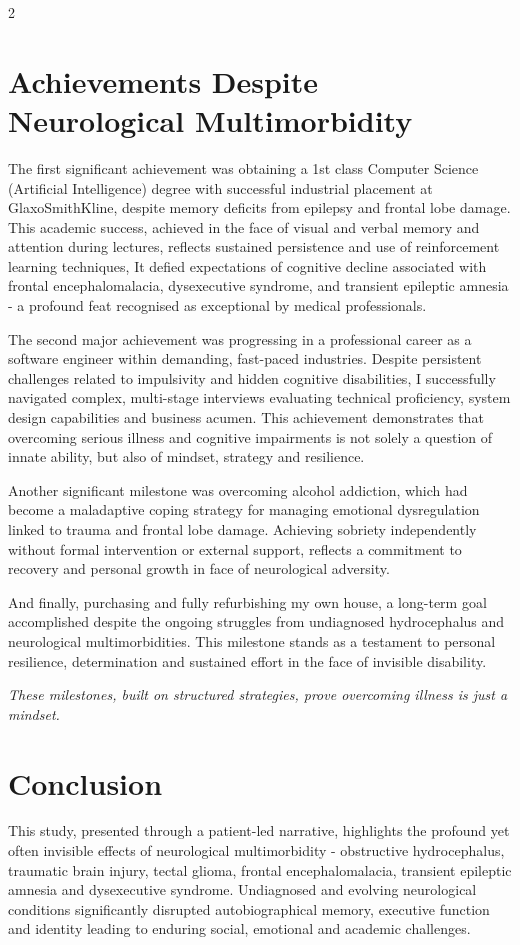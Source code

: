 \documentclass{article}
\begin{document}
\begin{multicols}{2}
\section*{Achievements Despite \\Neurological Multimorbidity}
The first significant achievement was obtaining a 1st class Computer Science (Artificial Intelligence) degree with successful industrial placement at GlaxoSmithKline, despite memory deficits from epilepsy and frontal lobe damage. This academic success, achieved in the face of visual and verbal memory and attention during lectures, reflects sustained persistence and use of reinforcement learning techniques, It defied expectations of cognitive decline associated with frontal encephalomalacia, dysexecutive syndrome, and transient epileptic amnesia - a profound feat recognised as exceptional by medical professionals.

The second major achievement was progressing in a professional career as a software engineer within demanding, fast-paced industries. Despite persistent challenges related to impulsivity and hidden cognitive disabilities, I successfully navigated complex, multi-stage interviews evaluating technical proficiency, system design capabilities and business acumen. This achievement demonstrates that overcoming serious illness and cognitive impairments is not solely a question of innate ability, but also of mindset, strategy and resilience.

Another significant milestone was overcoming alcohol addiction, which had become a maladaptive coping strategy for managing emotional dysregulation linked to trauma and frontal lobe damage. Achieving sobriety independently without formal intervention or external support, reflects a commitment to recovery and personal growth in face of neurological adversity.

And finally, purchasing and fully refurbishing my own house, a long-term goal accomplished despite the ongoing struggles from undiagnosed hydrocephalus and neurological multimorbidities. This milestone stands as a testament to personal resilience, determination and sustained effort in the face of invisible disability.
\begin{center}
\textit{
These milestones, built on structured strategies, prove overcoming illness is just a mindset.}
\end{center}

\section*{Conclusion}
This study, presented through a patient-led narrative, highlights the profound yet often invisible effects of neurological multimorbidity - obstructive hydrocephalus, traumatic brain injury, tectal glioma, frontal encephalomalacia, transient epileptic amnesia and dysexecutive syndrome. Undiagnosed and evolving neurological conditions significantly disrupted autobiographical memory, executive function and identity leading to enduring social, emotional and academic challenges.


\end{multicols}
\end{document}
